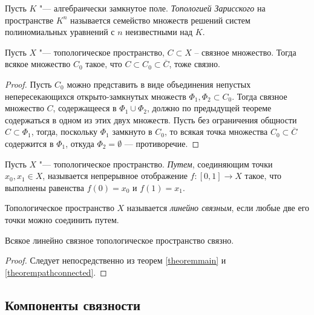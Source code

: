 \begin{definition}
	Пусть $K$ "--- алгебраически замкнутое поле. \textit{Топологией Зарисского} на пространстве $K^n$ называется семейство множеств решений систем полиномиальных уравнений с $n$ неизвестными над $K$.
\end{definition}

\begin{theorem} \label{theoremclosureconnected}
	Пусть $X$ "--- топологическое пространство, $C \subset X$ -- связное множество. Тогда всякое множество $C_0$ такое, что $C \subset C_0 \subset \overline{C}$, тоже связно.
\end{theorem}

\begin{proof}
	Пусть $C_0$ можно представить в виде объединения непустых непересекающихся открыто-замкнутых множеств $\Phi_1, \Phi_2 \subset C_0$. Тогда связное множество $C$, содержащееся в $\Phi_1 \cup \Phi_2$, должно по предыдущей теореме содержаться в одном из этих двух множеств. Пусть без ограничения общности $C \subset \Phi_1$, тогда, поскольку $\Phi_1$ замкнуто в $C_0$, то всякая точка множества $C_0 \subset \overline C$ содержится в $\Phi_1$, откуда $\Phi_2 = \emptyset$ --- противоречие.
\end{proof}

\begin{definition}
	Пусть $X$ "--- топологическое пространство. \textit{Путем}, соединяющим точки $x_0, x_1 \in X$, называется непрерывное отображение $f: [0, 1] \rightarrow X$ такое, что выполнены равенства $f(0) = x_0$ и $f(1) = x_1$.
\end{definition}

\begin{definition}
	Топологическое пространство $X$ называется \textit{линейно связным}, если любые две его точки можно соединить путем.
\end{definition}

\begin{proposition}
	Всякое линейно связное топологическое пространство связно.
\end{proposition}

\begin{proof}
	Следует непосредственно из теорем \ref{theoremmain} и \ref{theorempathconnected}.
\end{proof}

\subsection{Компоненты связности}

